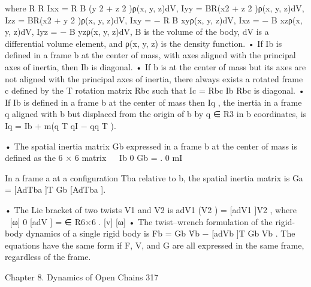 \documentclass[12pt,a4paper]{article}
\begin{document}
        where
                   R                                             R
             Ixx = R B (y 2 + z 2 )ρ(x, y, z)dV,           Iyy = BR(x2 + z 2 )ρ(x, y, z)dV,
             Izz = BR(x2 + y 2 )ρ(x, y, z)dV,              Ixy = − R B xyρ(x, y, z)dV,
             Ixz = − B xzρ(x, y, z)dV,                     Iyz = − B yzρ(x, y, z)dV,
        B is the volume of the body, dV is a differential volume element, and
        ρ(x, y, z) is the density function.
      • If Ib is defined in a frame {b} at the center of mass, with axes aligned
        with the principal axes of inertia, then Ib is diagonal.
      • If {b} is at the center of mass but its axes are not aligned with the principal
        axes of inertia, there always exists a rotated frame {c} defined by the
                                                 T
        rotation matrix Rbc such that Ic = Rbc     Ib Rbc is diagonal.
      • If Ib is defined in a frame {b} at the center of mass then Iq , the inertia
        in a frame {q} aligned with {b} but displaced from the origin of {b} by
        q ∈ R3 in {b} coordinates, is
                                       Iq = Ib + m(q T qI − qq T ).

      • The spatial inertia matrix Gb expressed in a frame {b} at the center of
        mass is defined as the 6 × 6 matrix
                                                  
                                           Ib 0
                                    Gb =             .
                                            0 mI

        In a frame {a} at a configuration Tba relative to {b}, the spatial inertia
        matrix is
                               Ga = [AdTba ]T Gb [AdTba ].

      • The Lie bracket of two twists V1 and V2 is
                                          adV1 (V2 ) = [adV1 ]V2 ,
        where                                                 
                                                   [ω]    0
                                    [adV ] =                       ∈ R6×6 .
                                                   [v]   [ω]
      • The twist–wrench formulation of the rigid-body dynamics of a single rigid
        body is
                              Fb = Gb V̇b − [adVb ]T Gb Vb .
        The equations have the same form if F, V, and G are all expressed in the
        same frame, regardless of the frame.


Chapter 8. Dynamics of Open Chains                                                                  317
\end{document}

